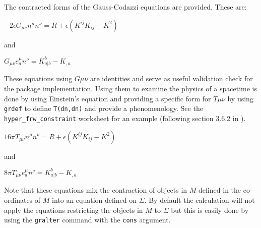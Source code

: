 \documentclass{article}
\begin{document}
The contracted forms of the Gauss-Codazzi equations are provided. These are:
\begin{center}
$-2 \epsilon G_{\mu \nu} n^\mu n^\nu = R + \epsilon \left( K^{i j}K_{ij} -K^2 \right)$ \\
\end{center}
and 
\begin{center}
$G_{\mu \nu} e^\mu_a n^\nu = K^b_{a|b} - K_{,a}$
\end{center}
These equations using $G{\mu \nu}$ are identities and serve as useful validation check for the package implementation. Using them to 
examine the physics of a spacetime is done by using Einstein's equation and providing a specific form for $T{\mu \nu}$
by using \texttt{grdef} to define \texttt{T(dn,dn)} and provide a phenomenology. See the \texttt{hyper\_frw\_constraint} worksheet
for an example (following section 3.6.2 in \cite{poisson:2004}). 

\begin{center}
$16 \pi T_{\mu \nu} n^\mu n^\nu = R + \epsilon \left( K^{i j}K_{ij} -K^2 \right)$ \\
\end{center}
and 
\begin{center}
$8 \pi T_{\mu \nu} e^\mu_a n^\nu = K^b_{a|b} - K_{,a}$
\end{center}

Note that these equations mix the contraction of objects in $M$ defined in the co-ordinates of $M$ into an equation 
defined on $\Sigma$. By default the 
calculation will not apply the equations restricting the objects in $M$ to $\Sigma$ but this is easily done by using the
\texttt{gralter} command with the \texttt{cons} argument. \\
\end{document}
